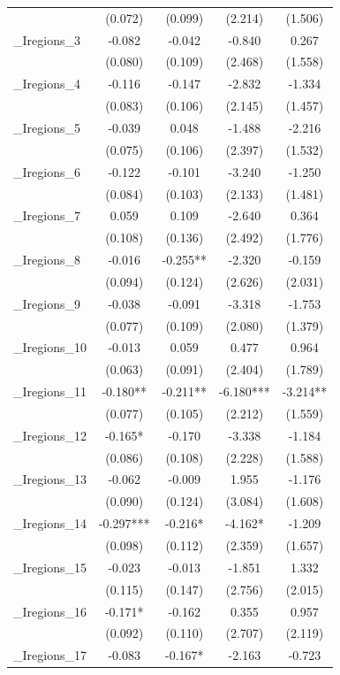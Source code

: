 \documentclass[]{article}
\begin{document}
\begin{tabular}{lcccc}
 & (0.072) & (0.099) & (2.214) & (1.506) \\
\_Iregions\_3 & -0.082 & -0.042 & -0.840 & 0.267 \\
 & (0.080) & (0.109) & (2.468) & (1.558) \\
\_Iregions\_4 & -0.116 & -0.147 & -2.832 & -1.334 \\
 & (0.083) & (0.106) & (2.145) & (1.457) \\
\_Iregions\_5 & -0.039 & 0.048 & -1.488 & -2.216 \\
 & (0.075) & (0.106) & (2.397) & (1.532) \\
\_Iregions\_6 & -0.122 & -0.101 & -3.240 & -1.250 \\
 & (0.084) & (0.103) & (2.133) & (1.481) \\
\_Iregions\_7 & 0.059 & 0.109 & -2.640 & 0.364 \\
 & (0.108) & (0.136) & (2.492) & (1.776) \\
\_Iregions\_8 & -0.016 & -0.255** & -2.320 & -0.159 \\
 & (0.094) & (0.124) & (2.626) & (2.031) \\
\_Iregions\_9 & -0.038 & -0.091 & -3.318 & -1.753 \\
 & (0.077) & (0.109) & (2.080) & (1.379) \\
\_Iregions\_10 & -0.013 & 0.059 & 0.477 & 0.964 \\
 & (0.063) & (0.091) & (2.404) & (1.789) \\
\_Iregions\_11 & -0.180** & -0.211** & -6.180*** & -3.214** \\
 & (0.077) & (0.105) & (2.212) & (1.559) \\
\_Iregions\_12 & -0.165* & -0.170 & -3.338 & -1.184 \\
 & (0.086) & (0.108) & (2.228) & (1.588) \\
\_Iregions\_13 & -0.062 & -0.009 & 1.955 & -1.176 \\
 & (0.090) & (0.124) & (3.084) & (1.608) \\
\_Iregions\_14 & -0.297*** & -0.216* & -4.162* & -1.209 \\
 & (0.098) & (0.112) & (2.359) & (1.657) \\
\_Iregions\_15 & -0.023 & -0.013 & -1.851 & 1.332 \\
 & (0.115) & (0.147) & (2.756) & (2.015) \\
\_Iregions\_16 & -0.171* & -0.162 & 0.355 & 0.957 \\
 & (0.092) & (0.110) & (2.707) & (2.119) \\
\_Iregions\_17 & -0.083 & -0.167* & -2.163 & -0.723 \\

\end{tabular}
\end{document}
